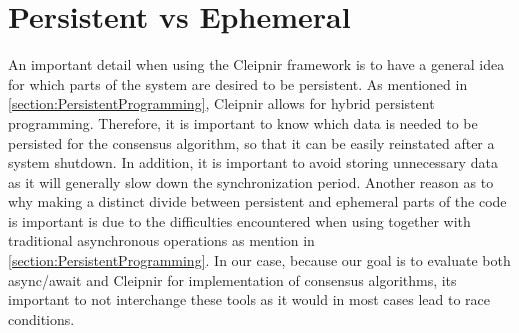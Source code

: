 \section{Persistent vs Ephemeral}
\label{sec:persvsephe}
An important detail when using the Cleipnir framework is to have a general idea for which parts of the system are desired to be persistent. As mentioned in \autoref{section:PersistentProgramming}, Cleipnir allows for hybrid persistent programming. Therefore, it is important to know which data is needed to be persisted for the consensus algorithm, so that it can be easily reinstated after a system shutdown. In addition, it is important to avoid storing unnecessary data as it will generally slow down the synchronization period. Another reason as to why making a distinct divide between persistent and ephemeral parts of the code is important is due to the difficulties encountered when using  together with traditional asynchronous operations as mention in \autoref{section:PersistentProgramming}. In our case, because our goal is to evaluate both async/await and Cleipnir for implementation of consensus algorithms, its important to not interchange these tools as it would in most cases lead to race conditions.

